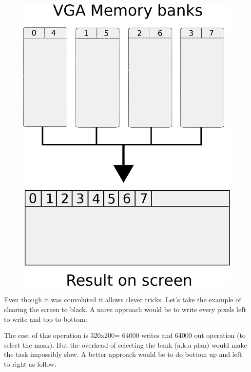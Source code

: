 \documentclass[book.tex]{subfiles}
\begin{document}
\begin{figure}[H]
\centering
\includegraphics[width=\textwidth]{imgs/vga_ram_screen_layout.eps}
\end{figure}

Even though it was convoluted it allows clever tricks. Let's take the example of clearing the screen to black. A naive approach would be to write every pixels left to write and top to bottom:

\begin{minipage}{\textwidth}

\end{minipage}

The cost of this operation is 320x200= 64000 writes and 64000 out operation (to select the mask).
But the overhead of selecting the bank (a.k.a plan) would make the task impossibly slow. A better approach would be to do bottom up and left to right as follow:
\end{document}
